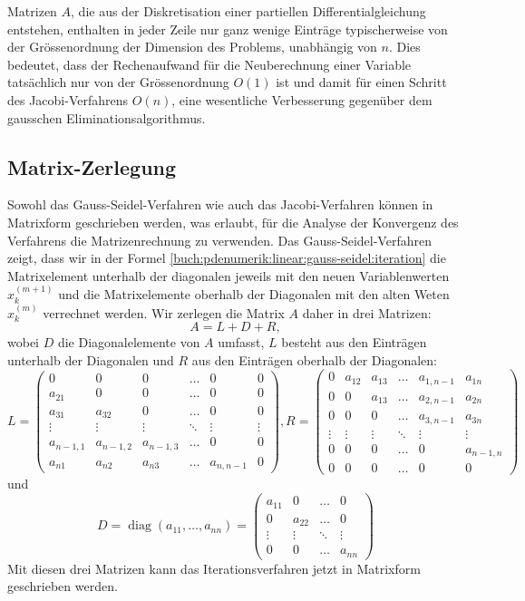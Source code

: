 Matrizen $A$, die aus der Diskretisation einer partiellen
Differentialgleichung entstehen, enthalten in jeder Zeile nur ganz
wenige Einträge typischerweise von der Grössenordnung der
Dimension des Problems, unabhängig von $n$.
Dies bedeutet, dass der Rechenaufwand für die Neuberechnung
einer Variable tatsächlich nur von der Grössenordnung $O(1)$ ist
und damit für einen Schritt des Jacobi-Verfahrens $O(n)$, eine
wesentliche Verbesserung gegenüber dem gausschen Eliminationsalgorithmus.

%
%
\subsection{Matrix-Zerlegung
\label{buch:pdenumerik:linear:subsection:matrix-zerlegung}}
Sowohl das Gauss-Seidel-Verfahren wie auch das Jacobi-Verfahren können
in Matrixform geschrieben werden, was erlaubt, für die Analyse der Konvergenz
des Verfahrens die Matrizenrechnung zu verwenden.
Das Gauss-Seidel-Verfahren zeigt, dass wir in der Formel
\eqref{buch:pdenumerik:linear:gauss-seidel:iteration}
die Matrixelement unterhalb der diagonalen jeweils mit den neuen
Variablenwerten $x_k^{(m+1)}$ und die Matrixelemente oberhalb der
Diagonalen mit den alten Weten $x_k^{(m)}$ verrechnet werden.
Wir zerlegen die Matrix $A$ daher in drei Matrizen:
\[
A = L + D + R,
\]
wobei $D$ die Diagonalelemente von $A$ umfasst, $L$ besteht aus den
Einträgen unterhalb der Diagonalen und $R$ aus den Einträgen oberhalb der
Diagonalen:
\[
L
=
\begin{pmatrix}
        0&        0&        0& \dots&        0&     0\\
   a_{21}&        0&        0& \dots&        0&     0\\
   a_{31}&   a_{32}&        0& \dots&        0&     0\\[-3pt]
   \vdots&   \vdots&   \vdots&\ddots&   \vdots&\vdots\\
a_{n-1,1}&a_{n-1,2}&a_{n-1,3}& \dots&        0&     0\\
   a_{n1}&   a_{n2}&   a_{n3}& \dots&a_{n,n-1}&     0
\end{pmatrix},
R
=
\begin{pmatrix}
     0&a_{12}&a_{13}& \dots&a_{1,n-1}&   a_{1n}\\
     0&     0&a_{13}& \dots&a_{2,n-1}&   a_{2n}\\
     0&     0&     0& \dots&a_{3,n-1}&   a_{3n}\\[-3pt]
\vdots&\vdots&\vdots&\ddots&   \vdots&   \vdots\\
     0&     0&     0& \dots&        0&a_{n-1,n}\\
     0&     0&     0& \dots&        0&        0
\end{pmatrix}
\]
und
\[
D
=
\operatorname{diag}(a_{11},\dots,a_{nn})
=
\begin{pmatrix}
a_{11}&     0& \dots&     0\\
     0&a_{22}& \dots&     0\\[-3pt]
\vdots&\vdots&\ddots&\vdots\\
     0&     0& \dots& a_{nn}
\end{pmatrix}
\]
Mit diesen drei Matrizen kann das Iterationsverfahren jetzt in
Matrixform geschrieben werden.


